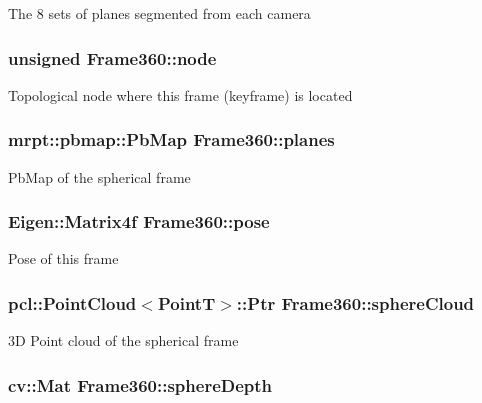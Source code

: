 The 8 sets of planes segmented from each camera \hypertarget{classFrame360_a18000b5f4598be1308feb31604005aaa}{
\subsubsection[{node}]{\setlength{\rightskip}{0pt plus 5cm}unsigned Frame360\-::node}}\label{classFrame360_a18000b5f4598be1308feb31604005aaa}
Topological node where this frame (keyframe) is located \hypertarget{classFrame360_a254179ae203a42b5e031182edff6c338}{
\subsubsection[{planes}]{\setlength{\rightskip}{0pt plus 5cm}mrpt\-::pbmap\-::\-Pb\-Map Frame360\-::planes}}\label{classFrame360_a254179ae203a42b5e031182edff6c338}
Pb\-Map of the spherical frame \hypertarget{classFrame360_a0b8606bc778a24d3545ef2ec04a6d88b}{
\subsubsection[{pose}]{\setlength{\rightskip}{0pt plus 5cm}Eigen\-::\-Matrix4f Frame360\-::pose}}\label{classFrame360_a0b8606bc778a24d3545ef2ec04a6d88b}
Pose of this frame \hypertarget{classFrame360_a3658614a807a6c6e7e3cbf1a21dd2240}{
\subsubsection[{sphere\-Cloud}]{\setlength{\rightskip}{0pt plus 5cm}pcl\-::\-Point\-Cloud$<$Point\-T$>$\-::Ptr Frame360\-::sphere\-Cloud}}\label{classFrame360_a3658614a807a6c6e7e3cbf1a21dd2240}
3\-D Point cloud of the spherical frame \hypertarget{classFrame360_a6a63c76c3e610f608970f2661fef8adb}{
\subsubsection[{sphere\-Depth}]{\setlength{\rightskip}{0pt plus 5cm}cv\-::\-Mat Frame360\-::sphere\-Depth}}\label{classFrame360_a6a63c76c3e610f608970f2661fef8adb}
